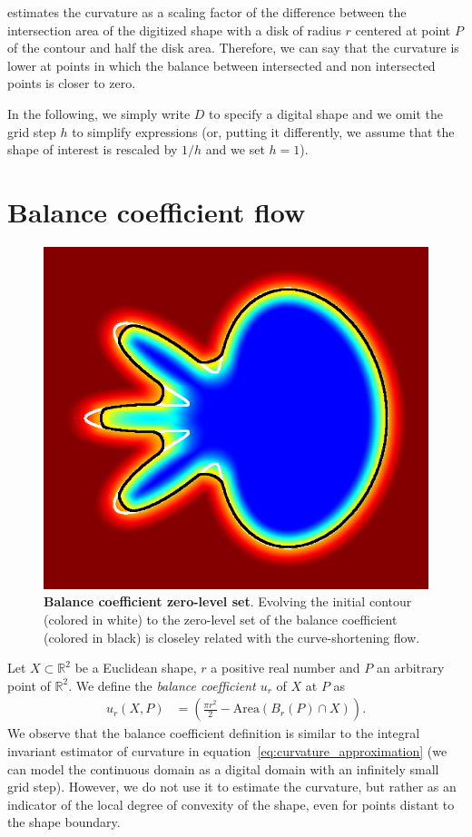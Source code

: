 \documentclass{siamart220329}
\newcommand{\R}{\mathbb{R}}
\begin{document}
 estimates the curvature as a scaling factor of
the difference between the intersection area of the digitized shape with a disk
of radius $r$ centered at point $P$ of the contour and half the disk area.
Therefore, we can say that the curvature is lower at points in which the balance
between intersected and non intersected points is closer to zero.

In the following, we simply write $D$ to specify a digital shape and we omit the
grid step $h$ to simplify expressions (or, putting it differently, we assume
that the shape of interest is rescaled by $1/h$ and we set $h = 1$).
%
%
%
%
%
\section{Balance coefficient flow}
%
%
\begin{figure}
\center
\includegraphics[scale=0.32]{figures/zero-level-set/balance-coefficient-zero-level-set.png}
\caption{\textbf{Balance coefficient zero-level set}. Evolving the initial
contour (colored in white) to the zero-level set of the balance coefficient
(colored in black) is closeley related with the curve-shortening flow.}
\label{fig:balance-coefficient-zero-level-set}
\end{figure}
%
%
Let $X \subset \R^2$ be a Euclidean shape, $r$ a positive real number and $P$ an
arbitrary point of $\R^2$. We define the \emph{balance coefficient $u_r$} of $X$
at $P$ as
%
%
\begin{align*}
  u_r(X,P) &= \left( \frac{\pi r^2}{2} - \text{Area}(B_r(P) \cap X) \right).
\end{align*}
%
%
We observe that the balance coefficient definition is similar to the integral
invariant estimator of curvature in equation~\cref{eq:curvature_approximation}
(we can model the continuous domain as a digital domain with an infinitely small
grid step). However, we do not use it to estimate the curvature, but rather as
an indicator of the local degree of convexity of the shape, even for points
distant to the shape boundary.
\end{document}
